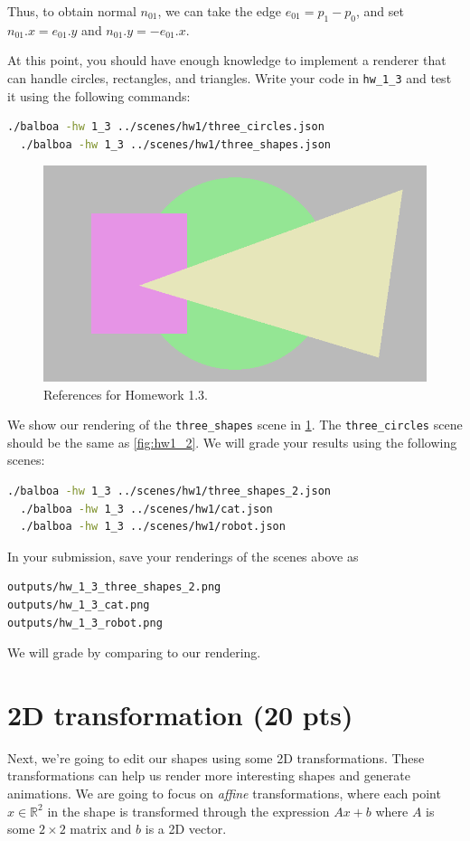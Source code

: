 Thus, to obtain normal $n_{01}$, we can take the edge $e_{01} = p_1 - p_0$, and set $n_{01}.x = e_{01}.y$ and $n_{01}.y = -e_{01}.x$.

At this point, you should have enough knowledge to implement a renderer that can handle circles, rectangles, and triangles. Write your code in \lstinline{hw_1_3} and test it using the following commands:
\begin{lstlisting}[language=bash]
  ./balboa -hw 1_3 ../scenes/hw1/three_circles.json
  ./balboa -hw 1_3 ../scenes/hw1/three_shapes.json
\end{lstlisting}

\begin{figure}[ht]
    \centering
    \includegraphics[width=0.5\linewidth]{imgs/hw_1_3.png}
    \caption{References for Homework 1.3.}
    \label{fig:hw1_3}
\end{figure}

We show our rendering of the \lstinline{three_shapes} scene in \cref{fig:hw1_3}. The \lstinline{three_circles} scene should be the same as \cref{fig:hw1_2}.
We will grade your results using the following scenes:
\begin{lstlisting}[language=bash]
  ./balboa -hw 1_3 ../scenes/hw1/three_shapes_2.json
  ./balboa -hw 1_3 ../scenes/hw1/cat.json
  ./balboa -hw 1_3 ../scenes/hw1/robot.json
\end{lstlisting}
In your submission, save your renderings of the scenes above as
\begin{lstlisting}[language=bash]
outputs/hw_1_3_three_shapes_2.png
outputs/hw_1_3_cat.png
outputs/hw_1_3_robot.png
\end{lstlisting}
We will grade by comparing to our rendering.

\section{2D transformation (20 pts)}

Next, we're going to edit our shapes using some 2D transformations. These transformations can help us render more interesting shapes and generate animations. We are going to focus on \emph{affine} transformations, where each point $x \in \mathbb{R}^2$ in the shape is transformed through the expression $Ax + b$ where $A$ is some $2 \times 2$ matrix and $b$ is a 2D vector. 

